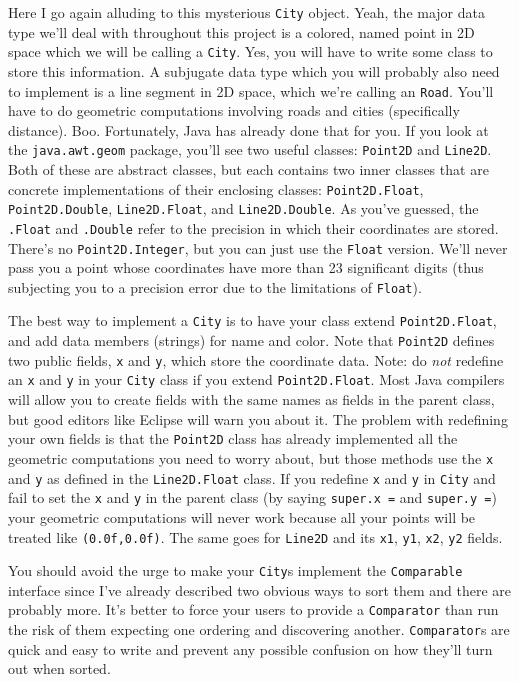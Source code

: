 \documentclass[12pt]{article}
\begin{document}
Here I go again alluding to this mysterious \texttt{City} object.
Yeah, the major data type we'll deal with throughout this project is a
colored, named point in 2D space which we will be calling a
\texttt{City}.  Yes, you will have to write some class to store this
information.  A subjugate data type which you will probably also need
to implement is a line segment in 2D space, which we're calling an
\texttt{Road}.  You'll have to do geometric computations involving
roads and cities (specifically distance).  Boo.  Fortunately, Java has
already done that for you.  If you look at the \texttt{java.awt.geom}
package, you'll see two useful classes: \texttt{Point2D} and
\texttt{Line2D}.  Both of these are abstract classes, but each
contains two inner classes that are concrete implementations of their
enclosing classes: \texttt{Point2D.Float}, \texttt{Point2D.Double},
\texttt{Line2D.Float}, and \texttt{Line2D.Double}.  As you've guessed,
the \texttt{.Float} and \texttt{.Double} refer to the precision in
which their coordinates are stored.  There's no
\texttt{Point2D.Integer}, but you can just use the \texttt{Float}
version.  We'll never pass you a point whose coordinates have more
than 23 significant digits (thus subjecting you to a precision error
due to the limitations of \texttt{Float}).

The best way to implement a \texttt{City} is to have your class extend
\texttt{Point2D.Float}, and add data members (strings) for name and
color.  Note that \texttt{Point2D} defines two public fields,
\texttt{x} and \texttt{y}, which store the coordinate data.  Note: do
\emph{not} redefine an \texttt{x} and \texttt{y} in your \texttt{City}
class if you extend \texttt{Point2D.Float}.  Most Java compilers will
allow you to create fields with the same names as fields in the parent
class, but good editors like Eclipse will warn you about it.  The
problem with redefining your own fields is that the \texttt{Point2D}
class has already implemented all the geometric computations you need
to worry about, but those methods use the \texttt{x} and \texttt{y} as
defined in the \texttt{Line2D.Float} class.  If you redefine
\texttt{x} and \texttt{y} in \texttt{City} and fail to set the
\texttt{x} and \texttt{y} in the parent class (by saying
\texttt{super.x =} and \texttt{super.y =}) your geometric computations
will never work because all your points will be treated like
\texttt{(0.0f,0.0f)}.  The same goes for \texttt{Line2D} and its
\texttt{x1}, \texttt{y1}, \texttt{x2}, \texttt{y2} fields.

You should avoid the urge to make your \texttt{City}s 
implement the \texttt{Comparable} interface since I've already
described two obvious ways to sort them and there are probably more.
It's better to force your users to provide a \texttt{Comparator} than
run the risk of them expecting one ordering and discovering another.
\texttt{Comparator}s are quick and easy to write and prevent any
possible confusion on how they'll turn out when sorted.
\end{document}
